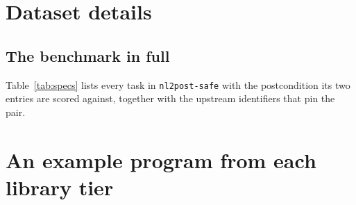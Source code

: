 \documentclass[11pt,letterpaper]{article}
\begin{document}
\appendix

\section{Dataset details}
\label{sec:dsdetails}

\subsection{The benchmark in full}
\label{sec:specs}

Table~\ref{tab:specs} lists every task in \texttt{nl2post-safe} with the
postcondition its two entries are scored against, together with the upstream
identifiers that pin the pair. 



\section{An example program from each library tier}
\label{sec:tierex}


\end{document}
